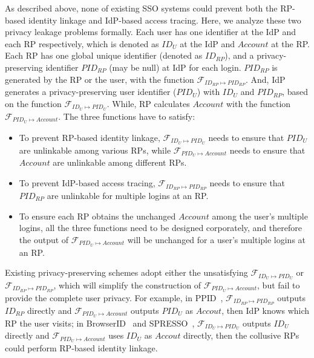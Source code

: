 As described above, none of existing SSO systems could prevent both the RP-based identity linkage and IdP-based access tracing.
Here, we analyze these two privacy leakage problems formally.
Each user has one identifier at the IdP and each RP respectively, which is denoted as $ID_U$ at the IdP and $Account$ at the RP.
Each RP has one global unique identifier (denoted as $ID_{RP}$), and a privacy-preserving identifier $PID_{RP}$ (may be null) at IdP for each login.
$PID_{RP}$ is generated by the RP or the user, with the function $\mathcal{F}_{ID_{RP} \mapsto PID_{RP}}$. %
And, IdP generates a  privacy-preserving user identifier ($PID_U$) with $ID_U$ and $PID_{RP}$, based on the function $\mathcal{F}_{ID_{U} \mapsto PID_{U}}$. %
While,  RP calculates $Account$ with the function  $\mathcal{F}_{PID_{U} \mapsto Account}$. %
The three functions   have to satisfy:
\begin{itemize}
  \item To prevent RP-based identity linkage, $\mathcal{F}_{ID_{U} \mapsto PID_{U}}$ needs to ensure that $PID_{U}$ are  unlinkable among various RPs, while $\mathcal{F}_{PID_{U} \mapsto Account}$ needs to ensure that $Account$ are unlinkable among different RPs.
  \item To prevent IdP-based access tracing, $\mathcal{F}_{ID_{RP} \mapsto PID_{RP}}$ needs to ensure that $PID_{RP}$ are  unlinkable for multiple logins at an RP.
  \item To ensure each RP obtains the unchanged $Account$ among the user's multiple logins,
  all the three functions need to be designed corporately,
   and therefore the output of $\mathcal{F}_{PID_{U} \mapsto Account}$ will be unchanged for a user's multiple logins at an RP.
\end{itemize}


Existing privacy-preserving schemes adopt either the unsatisfying $\mathcal{F}_{ID_{U} \mapsto PID_{U}}$ or $\mathcal{F}_{ID_{RP} \mapsto PID_{RP}}$,
 which will simplify the construction of $\mathcal{F}_{PID_{U} \mapsto Account}$, but fail to provide the complete user privacy.
For example,
in PPID~\cite{OpenIDConnect, SAMLIdentifier},
$\mathcal{F}_{ID_{RP} \mapsto PID_{RP}}$ outputs $ID_{RP}$ directly and $\mathcal{F}_{PID_{U} \mapsto Account}$ outputs  $PID_{U}$ as $Accout$, then IdP knows which RP the user visits;
in BrowserID~\cite{BrowserID} and SPRESSO~\cite{SPRESSO},
$\mathcal{F}_{ID_{U} \mapsto PID_{U}}$ outputs $ID_U$ directly and $\mathcal{F}_{PID_{U} \mapsto Account}$ uses $ID_U$ as $Accout$ directly, then the collusive RPs could perform  RP-based identity linkage.




